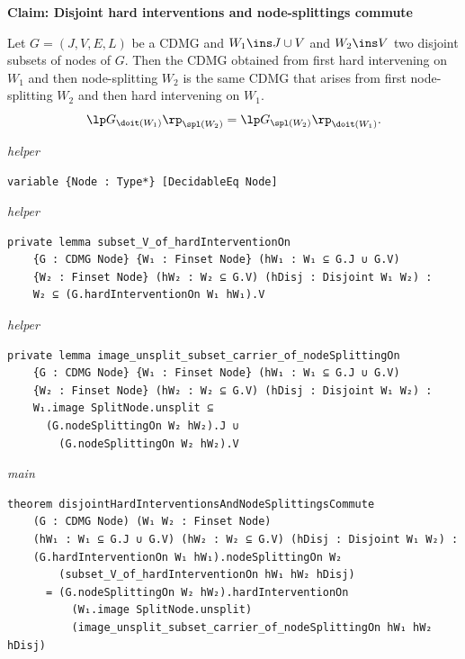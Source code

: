 \vspace{\appendixNotesGap}

\noindent\textbf{Claim: Disjoint hard interventions and node-splittings commute}\par\smallskip
{\appendixTexSize
   Let $G=(J,V,E,L)$ be a CDMG and $W_1 \ins J \cup V$ and $W_2 \ins V$ two disjoint subsets of nodes of $G$.
   Then the CDMG obtained from first hard intervening on $W_1$ and then node-splitting $W_2$ is the same CDMG that arises from first node-splitting $W_2$ and then hard intervening on $W_1$.
      \[ \lp G_{\doit(W_1)} \rp_{\spl(W_2)} =  \lp G_{\spl(W_2)} \rp_{\doit(W_1)}.   \]
\par}
\smallskip
{\small\textit{helper}}
\begin{verbatim}
variable {Node : Type*} [DecidableEq Node]
\end{verbatim}
{\small\textit{helper}}
\begin{verbatim}
private lemma subset_V_of_hardInterventionOn
    {G : CDMG Node} {W₁ : Finset Node} (hW₁ : W₁ ⊆ G.J ∪ G.V)
    {W₂ : Finset Node} (hW₂ : W₂ ⊆ G.V) (hDisj : Disjoint W₁ W₂) :
    W₂ ⊆ (G.hardInterventionOn W₁ hW₁).V
\end{verbatim}
{\small\textit{helper}}
\begin{verbatim}
private lemma image_unsplit_subset_carrier_of_nodeSplittingOn
    {G : CDMG Node} {W₁ : Finset Node} (hW₁ : W₁ ⊆ G.J ∪ G.V)
    {W₂ : Finset Node} (hW₂ : W₂ ⊆ G.V) (hDisj : Disjoint W₁ W₂) :
    W₁.image SplitNode.unsplit ⊆
      (G.nodeSplittingOn W₂ hW₂).J ∪
        (G.nodeSplittingOn W₂ hW₂).V
\end{verbatim}
{\small\textit{main}}
\begin{verbatim}
theorem disjointHardInterventionsAndNodeSplittingsCommute
    (G : CDMG Node) (W₁ W₂ : Finset Node)
    (hW₁ : W₁ ⊆ G.J ∪ G.V) (hW₂ : W₂ ⊆ G.V) (hDisj : Disjoint W₁ W₂) :
    (G.hardInterventionOn W₁ hW₁).nodeSplittingOn W₂
        (subset_V_of_hardInterventionOn hW₁ hW₂ hDisj)
      = (G.nodeSplittingOn W₂ hW₂).hardInterventionOn
          (W₁.image SplitNode.unsplit)
          (image_unsplit_subset_carrier_of_nodeSplittingOn hW₁ hW₂ hDisj)
\end{verbatim}
~%

\vspace{\appendixNotesGap}

